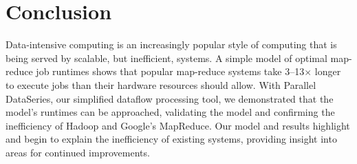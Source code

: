 \section{Conclusion}
\label{sec:conclusion}


Data-intensive computing is an increasingly popular style of computing
that is being served by scalable, but inefficient, systems.  A simple
model of optimal map-reduce job runtimes shows that popular map-reduce
systems take 3--13$\times$ longer to execute jobs than their hardware
resources should allow.  With Parallel DataSeries, our simplified
dataflow processing tool, we demonstrated that the model's runtimes
can be approached, validating the model and confirming the
inefficiency of Hadoop and Google's MapReduce.  Our model and results
highlight and begin to explain the inefficiency of existing systems,
providing insight into areas for continued improvements.


